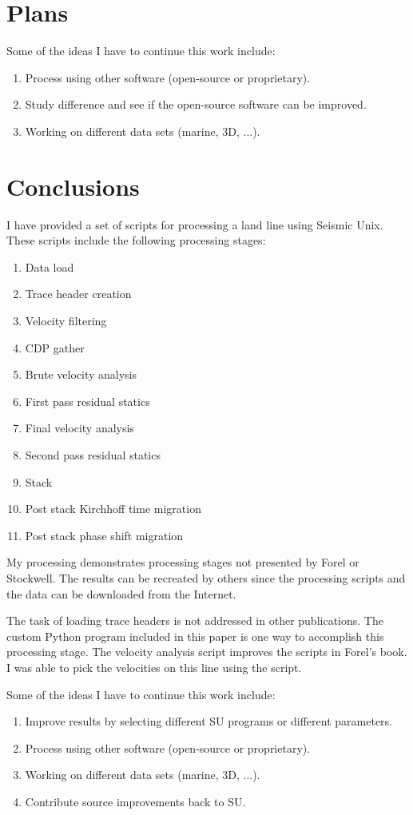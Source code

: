 \section{Plans}
Some of the ideas I have to continue this work include:

\begin{enumerate}
\item Process using other software (open-source or proprietary). 
\item Study difference and see if the open-source software can be improved.
\item Working on different data sets (marine, 3D, ...).
\end{enumerate}

\section{Conclusions}
I have provided a set of scripts for processing a land line using
Seismic Unix. These scripts include the following processing stages:
\begin{enumerate}
\item Data load
\item Trace header creation
\item Velocity filtering 
\item CDP gather
\item Brute velocity analysis
\item First pass residual statics
\item Final velocity analysis
\item Second pass residual statics
\item Stack
\item Post stack Kirchhoff time migration
\item Post stack phase shift migration
\end{enumerate}

My processing demonstrates processing stages not presented by Forel
or Stockwell. The results can be recreated by others since the processing
scripts and the data can be downloaded from the Internet.

The task of loading trace headers is not addressed in other
publications.  The custom Python program included in this paper is one
way to accomplish this processing stage.  The velocity analysis script 
improves the scripts in Forel's book.  I was able to pick the velocities 
on this line using the script.

Some of the ideas I have to continue this work include:
\begin{enumerate}
\item Improve results by selecting different SU programs or different 
parameters. 
\item Process using other software (open-source or proprietary).
\item Working on different data sets (marine, 3D, ...).
\item Contribute source improvements back to SU.
\end{enumerate}

